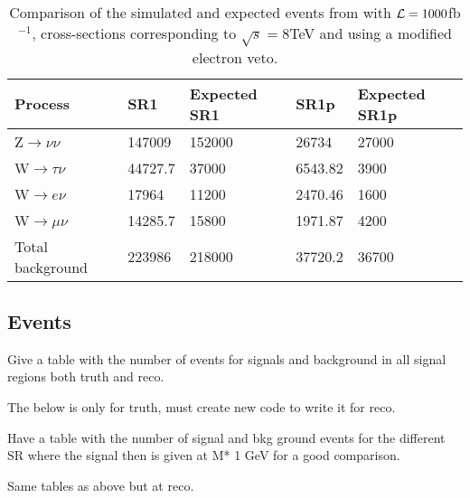 \begin{table}[ht]
\begin{center}
\begin{tabular}{|l|l|l|l|l|}
\hline
Process & SR1  & Expected SR1 & SR1p & Expected SR1p  \\ \hline
Z$\rightarrow\nu\nu$ & 147009 & 152000 & 26734 & 27000 \\
W$\rightarrow\tau\nu$ & 44727.7 & 37000 & 6543.82 & 3900 \\
W$\rightarrow e\nu$ & 17964 & 11200 & 2470.46 & 1600 \\
W$\rightarrow\mu\nu$ & 14285.7 & 15800 & 1971.87 & 4200 \\ \hline
Total background & 223986 & 218000 & 37720.2 & 36700 \\ \hline
\end{tabular}
\caption{Comparison of the simulated and expected events from \citep{ATLAS-CONF-2012-147} with $\mathcal{L}=1000$fb$^{-1}$, cross-sections corresponding to $\sqrt{s}=8$TeV and using a modified electron veto.}
\label{tab:newcomp}
\end{center}
\end{table}


\subsection{Events}
Give a table with the number of events for signals and background in all signal regions both truth and reco.

The below is only for truth, must create new code to write it for reco.


Have a table with the number of signal and bkg ground events for the different SR where the signal then is given at M* 1 GeV for a good comparison.

Same tables as above but at reco.

